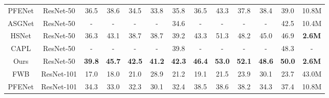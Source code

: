 \documentclass[lettersize,journal]{IEEEtran}
\begin{document}
\begin{table*}
\begin{tabular}{c|c|ccccc|ccccc|c}
PFENet \cite{RN6}                   & ResNet-50                 & 36.5                   & 38.6                   & 34.5                   & 33.8                   & 35.8                   & 36.5                   & 43.3                   & 37.8                   & 38.4                   & 39.0                      & 10.8M                                                                          \\
ASGNet \cite{RN9}                   & ResNet-50                 & -                      & -                      & -                      & -                      & 34.6                   & -                      & -                      & -                      & -                      & 42.5                      & 10.4M                                                                          \\
HSNet \cite{RN85}                   & ResNet-50                 & 36.3                   & 43.1                   & 38.7                   & 38.7                   & 39.2                   & 43.3                   & 51.3                   & 48.2                   & 45.0                   & 46.9                      & \textbf{2.6M}                                                                  \\ 
CAPL \cite{RN64}                    & ResNet-50                 & -                   & -                   & -                   & -                   & 39.8                   & -                   & -                   & -                   & -                   & 48.3                      & -                                                                  \\ 
\hline
Ours                    & ResNet-50                 & \textbf{39.8}          & \textbf{45.7}          & \textbf{42.5}          & \textbf{41.2}          & \textbf{42.3}          & \textbf{46.4}          & \textbf{53.0}          & \textbf{52.1}          & \textbf{48.6}          & \textbf{50.0}             & \textbf{2.6M}                                                 \\ 
\hline
FWB \cite{RN82}                      & ResNet-101                & 17.0                   & 18.0                   & 21.0                   & 28.9                   & 21.2                   & 19.1                   & 21.5                   & 23.9                   & 30.1                   & 23.7                      & 43.0M                                                                          \\
PFENet \cite{RN6}                   & ResNet-101                & 34.3                   & 33.0                   & 32.3                   & 30.1                   & 32.4                   & 38.5                   & 38.6                   & 38.2                   & 34.3                   & 37.4                      & 10.8M                                                                          \\

\end{tabular}
\end{table*}
\end{document}
